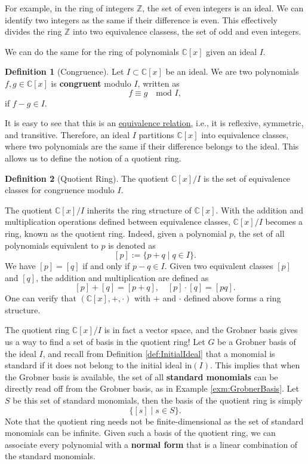 \documentclass[
]{book}
\theoremstyle{definition}
\newtheorem{definition}{Definition}[chapter]
\theoremstyle{definition}
\theoremstyle{definition}
\theoremstyle{definition}
\theoremstyle{remark}
\begin{document}
For example, in the ring of integers \(\mathbb{Z}\), the set of even integers is an ideal. We can identify two integers as the same if their difference is even. This effectively divides the ring \(\mathbb{Z}\) into two equivalence classess, the set of odd and even integers.

We can do the same for the ring of polynomials \(\mathbb{C}[x]\) given an ideal \(I\).

\begin{definition}[Congruence]
\protect\hypertarget{def:CongruenceIdeal}{}\label{def:CongruenceIdeal}Let \(I \subset \mathbb{C}[x]\) be an ideal. We are two polynomials \(f,g \in \mathbb{C}[x]\) is \textbf{congruent} modulo \(I\), written as
\[
f \equiv g \quad \text{mod } I,
\]
if \(f - g \in I\).
\end{definition}

It is easy to see that this is an \href{https://en.wikipedia.org/wiki/Equivalence_relation}{equivalence relation}, i.e., it is reflexive, symmetric, and transitive. Therefore, an ideal \(I\) partitions \(\mathbb{C}[x]\) into equivalence classes, where two polynomials are the same if their difference belongs to the ideal. This allows us to define the notion of a quotient ring.

\begin{definition}[Quotient Ring]
\protect\hypertarget{def:QuotientRing}{}\label{def:QuotientRing}The quotient \(\mathbb{C}[x]/I\) is the set of equivalence classes for congruence modulo \(I\).
\end{definition}

The quotient \(\mathbb{C}[x]/I\) inherits the ring structure of \(\mathbb{C}[x]\). With the addition and multiplication operations defined between equivalence classes, \(\mathbb{C}[x]/I\) becomes a ring, known as the quotient ring. Indeed, given a polynomial \(p\), the set of all polynomials equivalent to \(p\) is denoted as
\[
[p]:= \{ p + q \mid q \in I \}.
\]
We have \([p] = [q]\) if and only if \(p - q \in I\). Given two equivalent classes \([p]\) and \([q]\), the addition and multiplication are defined as
\[
[p] + [q] = [p+q], \quad [p] \cdot [q] = [p q].
\]
One can verify that \((\mathbb{C}[x],+,\cdot)\) with \(+\) and \(\cdot\) defined above forms a ring structure.

The quotient ring \(\mathbb{C}[x]/I\) is in fact a vector space, and the Grobner basis gives us a way to find a set of basis in the quotient ring! Let \(G\) be a Grobner basis of the ideal \(I\), and recall from Definition \ref{def:InitialIdeal} that a monomial is standard if it does not belong to the initial ideal \(\mathrm{in}(I)\). This implies that when the Grobner basis is available, the set of all \textbf{standard monomials} can be directly read off from the Grobner basis, as in Example \ref{exm:GrobnerBasis}. Let \(S\) be this set of standard monomials, then the basis of the quotient ring is simply
\[
\{ [s] \mid s\in S \}.
\]
Note that the quotient ring needs not be finite-dimensional as the set of standard monomials can be infinite. Given such a basis of the quotient ring, we can associate every polynomial with a \textbf{normal form} that is a linear combination of the standard monomials.
\end{document}
